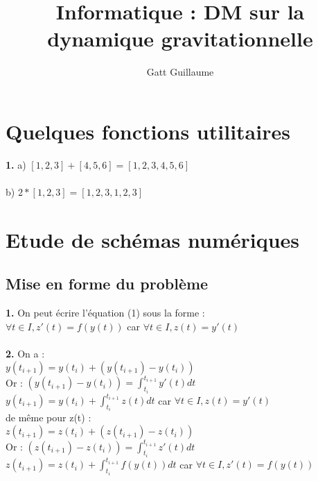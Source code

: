 \documentclass{article}
\begin{document}
\title{Informatique : DM sur la dynamique gravitationnelle}
\date{}
\author{Gatt Guillaume}
\maketitle
\renewcommand{\thesection}{\Roman{section}}
	\setlength{\parindent}{1.5cm}
\section{Quelques fonctions utilitaires }
{\bf 1.} a) $[1,2,3] + [4,5,6]=[1,2,3,4,5,6]$ \\
\\
b) $2 *[1,2,3]=[1,2,3,1,2,3]$

\newpage
\section{Etude de schémas numériques}
\subsection{Mise en forme du problème }
{\bf 1.} On peut écrire l'équation (1) sous la forme : \\
$\forall t \in I, z'(t)=f(y(t))$ car $\forall t \in I, z(t)=y'(t)$ \\
 \\
{\bf 2.} On a : \\
$y(t_{i+1})= y(t_i) + (y(t_{i+1}) - y(t_i))$ \\
Or : $(y(t_{i+1}) - y(t_i))=\int_{t_i}^{t_{i+1}}y'(t)dt$ \\
$y(t_{i+1})=y(t_i)+ \int_{t_i}^{t_{i+1}}z(t)dt$ car $\forall t \in I, z(t)=y'(t)$\\
de même pour z(t) : \\
$z(t_{i+1})= z(t_i) + (z(t_{i+1}) - z(t_i))$ \\
Or : $(z(t_{i+1}) - z(t_i))=\int_{t_i}^{t_{i+1}}z'(t)dt$ \\
$z(t_{i+1})=z(t_i)+ \int_{t_i}^{t_{i+1}}f(y(t))dt$ car $\forall t \in I, z'(t)=f(y(t))$
\end{document}

